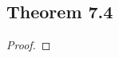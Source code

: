 \documentclass[../../main.tex]{subfiles}
\begin{document}
\subsection{Theorem 7.4}
\begin{wts}

\end{wts}
\begin{proof}

\end{proof}
\end{document}

